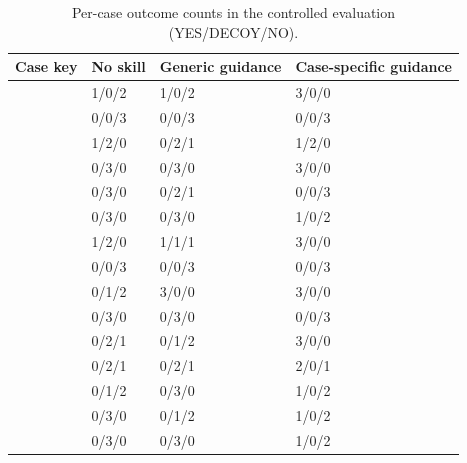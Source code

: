\documentclass[11pt]{article}
\newcommand{\tableformat}{\small\setlength{\tabcolsep}{4pt}\renewcommand{\arraystretch}{1.12}}
\newcommand{\thead}[1]{\textbf{#1}}
\begin{document}
\begin{table}[H]
\centering
\caption{Per-case outcome counts in the controlled evaluation (YES/DECOY/NO).}
\label{tab:per_case_results}
\tableformat
\begin{tabularx}{\textwidth}{L{0.38\textwidth} L{0.16\textwidth} L{0.16\textwidth} Y}
\toprule
\thead{Case key} & \thead{No skill} & \thead{Generic guidance} & \thead{Case-specific guidance} \\
\midrule
{} & 1/0/2 & 1/0/2 & 3/0/0 \\
 & 0/0/3 & 0/0/3 & 0/0/3 \\
\addlinespace[2pt]
 & 1/2/0 & 0/2/1 & 1/2/0 \\
 & 0/3/0 & 0/3/0 & 3/0/0 \\
 & 0/3/0 & 0/2/1 & 0/0/3 \\
 & 0/3/0 & 0/3/0 & 1/0/2 \\
\addlinespace[2pt]
 & 1/2/0 & 1/1/1 & 3/0/0 \\
\addlinespace[2pt]
 & 0/0/3 & 0/0/3 & 0/0/3 \\
 & 0/1/2 & 3/0/0 & 3/0/0 \\
\addlinespace[2pt]
 & 0/3/0 & 0/3/0 & 0/0/3 \\
 & 0/2/1 & 0/1/2 & 3/0/0 \\
 & 0/2/1 & 0/2/1 & 2/0/1 \\
 & 0/1/2 & 0/3/0 & 1/0/2 \\
 & 0/3/0 & 0/1/2 & 1/0/2 \\
\addlinespace[2pt]
 & 0/3/0 & 0/3/0 & 1/0/2 \\
\bottomrule
\end{tabularx}
\end{table}

\clearpage
\renewcommand{\bibfont}{\small}
\setlength{\bibsep}{1pt plus 0.3ex}


\end{document}
